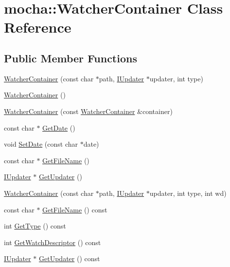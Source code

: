 \hypertarget{classmocha_1_1_watcher_container}{
\section{mocha::WatcherContainer Class Reference}
\label{classmocha_1_1_watcher_container}
}
\subsection*{Public Member Functions}
\begin{DoxyCompactItemize}
\item 
\hyperlink{classmocha_1_1_watcher_container_a30a9ad38fd24cb86f828b6b9454a8c55}{WatcherContainer} (const char $\ast$path, \hyperlink{classmocha_1_1_i_updater}{IUpdater} $\ast$updater, int type)
\item 
\hyperlink{classmocha_1_1_watcher_container_a725cfb555c4674ce00ed5ceebc5037c3}{WatcherContainer} ()
\item 
\hyperlink{classmocha_1_1_watcher_container_abc840434ee39682b04670780160a2e55}{WatcherContainer} (const \hyperlink{classmocha_1_1_watcher_container}{WatcherContainer} \&container)
\item 
const char $\ast$ \hyperlink{classmocha_1_1_watcher_container_aa2c6a461c5608e15061aad6bb5724d93}{GetDate} ()
\item 
void \hyperlink{classmocha_1_1_watcher_container_aeb33783d75f18f4d9ffacb7fb99dd00d}{SetDate} (const char $\ast$date)
\item 
const char $\ast$ \hyperlink{classmocha_1_1_watcher_container_a724bed3461eb22bfcca85b796b1ac68e}{GetFileName} ()
\item 
\hyperlink{classmocha_1_1_i_updater}{IUpdater} $\ast$ \hyperlink{classmocha_1_1_watcher_container_a5b296ecc7ebe6683c9d61c2b1b2ea0d8}{GetUpdater} ()
\item 
\hyperlink{classmocha_1_1_watcher_container_a18c42671387ad304f0e976784476f518}{WatcherContainer} (const char $\ast$path, \hyperlink{classmocha_1_1_i_updater}{IUpdater} $\ast$updater, int type, int wd)
\item 
const char $\ast$ \hyperlink{classmocha_1_1_watcher_container_a95bd983c2d6c66ef2c1501d7b631e1d1}{GetFileName} () const 
\item 
int \hyperlink{classmocha_1_1_watcher_container_a0451d51520c7467a65ab6d9187a2fb2a}{GetType} () const 
\item 
int \hyperlink{classmocha_1_1_watcher_container_abb1f771338a112e70cb989fffe56cd12}{GetWatchDescriptor} () const 
\item 
\hyperlink{classmocha_1_1_i_updater}{IUpdater} $\ast$ \hyperlink{classmocha_1_1_watcher_container_a4732d9c8b1bf07191fc9973ae416f1b8}{GetUpdater} () const 
\end{DoxyCompactItemize}
